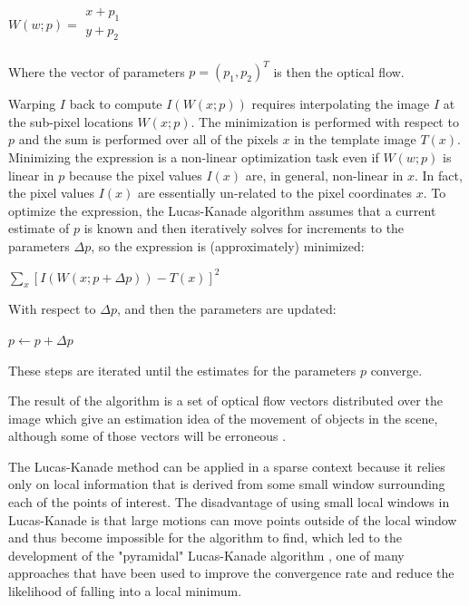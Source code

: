 \documentclass[msc, a4paper, classic, en]{ufbathesis}
\begin{document}
\begin{center}
$W(w;p) = \begin{matrix}
          x + p_1 \\
          y + p_2 \\
          \end{matrix}$
\end{center}

Where the vector of parameters $p = (p_1, p_2)^T$ is then the optical flow.

Warping $I$ back to compute $I(W(x;p))$ requires interpolating the image $I$ at the sub-pixel locations $W(x;p)$. The minimization is performed with respect to $p$ and the sum is performed over all of the pixels $x$ in the template image $T(x)$. Minimizing the expression is a non-linear optimization task even if $W(w;p)$ is linear in $p$ because the pixel values $I(x)$ are, in general, non-linear in $x$. In fact, the pixel values $I(x)$ are essentially un-related to the pixel coordinates $x$. To optimize the expression, the Lucas-Kanade algorithm assumes that a current estimate of $p$ is known and then iteratively solves for increments to the parameters $\Delta{p}$, so the expression is (approximately) minimized:

\begin{center}
  $\sum_{x}{[I(W(x;p + \Delta{p}))-T(x)]^2}$
\end{center}

With respect to $\Delta{p}$, and then the parameters are updated:

\begin{center}
  $p \gets p + \Delta{p}$
\end{center}

These steps are iterated until the estimates for the parameters $p$ converge.

The result of the algorithm is a set of optical flow vectors distributed over the image which give an estimation idea of the movement of objects in the scene, although some of those vectors will be erroneous \cite{raul}.

The Lucas-Kanade method can be applied in a sparse context because it relies only on local information that is derived from some small window surrounding each of the points of interest. The disadvantage of using small local windows in Lucas-Kanade is that large motions can move points outside of the local window and thus become impossible for the algorithm to find, which led to the development of the "pyramidal" Lucas-Kanade algorithm \cite{Bouguet00}, one of many approaches that have been used to improve the convergence rate and reduce the likelihood of falling into a local minimum.
\end{document}
